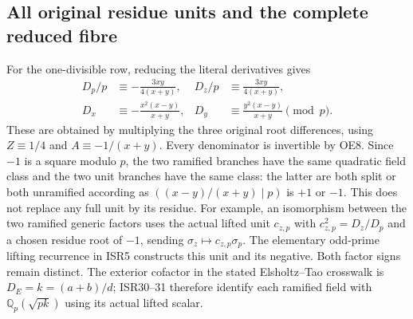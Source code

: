\subsection{All original residue units and the complete reduced fibre}
For the one-divisible row, reducing the literal derivatives gives
\begin{equation}
 \begin{aligned}
 D_p/p&\equiv-\frac{3xy}{4(x+y)},&
 D_z/p&\equiv\frac{3xy}{4(x+y)},\\
 D_x&\equiv-\frac{x^2(x-y)}{x+y},&
 D_y&\equiv\frac{y^2(x-y)}{x+y}\pmod p.
 \end{aligned}                                          \tag{OE14}
\end{equation}
These are obtained by multiplying the three original root
differences, using $Z\equiv1/4$ and $A\equiv-1/(x+y)$.
Every denominator is invertible by OE8. Since $-1$ is a square
modulo $p$, the two ramified branches have the same quadratic
field class and the two unit branches have the same class:
the latter are both split or both unramified according as
$((x-y)/(x+y)\mid p)$ is $+1$ or $-1$.
This does not replace any full unit by its residue. For example,
an isomorphism between the two ramified generic factors uses the
actual lifted unit $c_{z,p}$ with $c_{z,p}^2=D_z/D_p$ and a chosen
residue root of $-1$, sending $\sigma_z\mapsto c_{z,p}\sigma_p$.
The elementary odd-prime lifting recurrence in ISR5 constructs
this unit and its negative. Both factor signs remain distinct.
The exterior cofactor in the stated Elsholtz--Tao crosswalk is
$D_E=k=(a+b)/d$; ISR30--31 therefore identify each ramified field
with $\mathbb Q_p(\sqrt{pk})$ using its actual lifted scalar.

